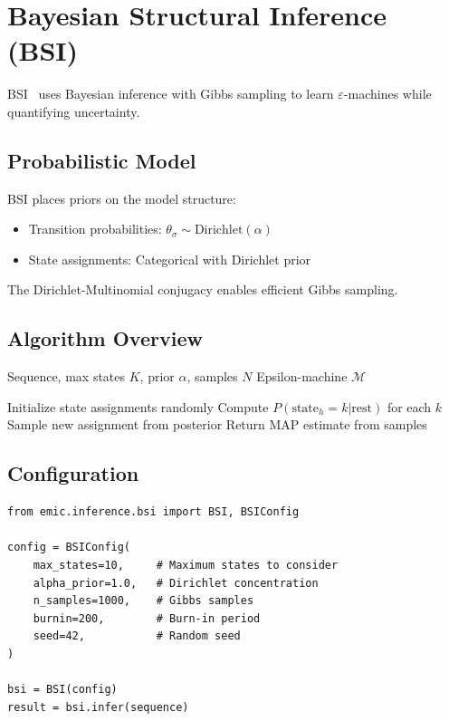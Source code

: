 \documentclass[11pt,a4paper]{report}
\theoremstyle{definition}
\theoremstyle{plain}
\newcommand{\eps}{\varepsilon}
\begin{document}
\section{Bayesian Structural Inference (BSI)}

BSI~\cite{strelioff2014bayesian} uses Bayesian inference with Gibbs sampling to learn $\eps$-machines while quantifying uncertainty.

\subsection{Probabilistic Model}

BSI places priors on the model structure:
\begin{itemize}
    \item Transition probabilities: $\theta_\sigma \sim \text{Dirichlet}(\alpha)$
    \item State assignments: Categorical with Dirichlet prior
\end{itemize}

The Dirichlet-Multinomial conjugacy enables efficient Gibbs sampling.

\subsection{Algorithm Overview}

\begin{algorithm}
\caption{Bayesian Structural Inference}
\begin{algorithmic}[1]
\Require Sequence, max states $K$, prior $\alpha$, samples $N$
\Ensure Epsilon-machine $\mathcal{M}$

\State Initialize state assignments randomly
        \State Compute $P(\text{state}_h = k | \text{rest})$ for each $k$
        \State Sample new assignment from posterior
    \EndFor
\EndFor
\State Return MAP estimate from samples
\end{algorithmic}
\end{algorithm}

\subsection{Configuration}

\begin{lstlisting}[caption={BSI configuration}]
from emic.inference.bsi import BSI, BSIConfig

config = BSIConfig(
    max_states=10,     # Maximum states to consider
    alpha_prior=1.0,   # Dirichlet concentration
    n_samples=1000,    # Gibbs samples
    burnin=200,        # Burn-in period
    seed=42,           # Random seed
)

bsi = BSI(config)
result = bsi.infer(sequence)
\end{lstlisting}
\end{document}
